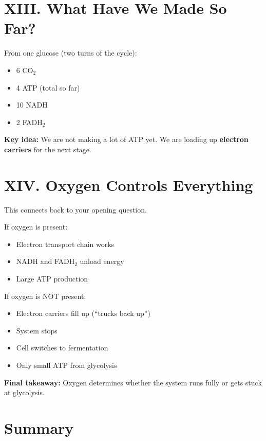 \documentclass[9pt]{article}
\begin{document}
\section*{XIII. What Have We Made So Far?}

From one glucose (two turns of the cycle):

\begin{itemize}
\item 6 CO$_2$
\item 4 ATP (total so far)
\item 10 NADH
\item 2 FADH$_2$
\end{itemize}

\medskip
\textbf{Key idea:}  
We are not making a lot of ATP yet.  
We are loading up \textbf{electron carriers} for the next stage.


\section*{XIV. Oxygen Controls Everything}

This connects back to your opening question.

\medskip
If oxygen is present:
\begin{itemize}
\item Electron transport chain works
\item NADH and FADH$_2$ unload energy
\item Large ATP production
\end{itemize}

If oxygen is NOT present:
\begin{itemize}
\item Electron carriers fill up (“trucks back up”)
\item System stops
\item Cell switches to fermentation
\item Only small ATP from glycolysis
\end{itemize}

\medskip
\textbf{Final takeaway:}  
Oxygen determines whether the system runs fully or gets stuck at glycolysis.


\section*{Summary}
\end{document}
